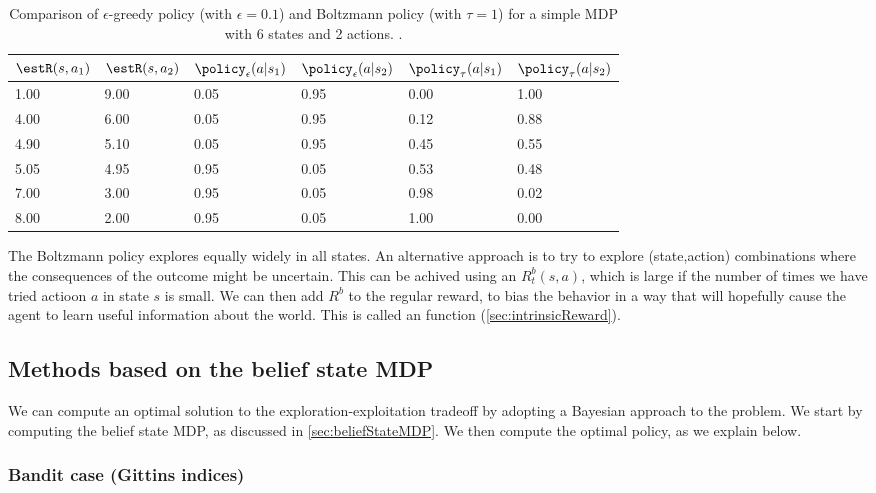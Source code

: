 \begin{table}
  \centering
\begin{tabular}{llllll}
  $\estR(s,a_1)$ & $\estR(s,a_2)$
  & $\policy_{\epsilon}(a|s_1)$     & $\policy_{\epsilon}(a|s_2)$  
    & $\policy_{\tau}(a|s_1)$     & $\policy_{\tau}(a|s_2)$     \\
  \hline
  1.00 & 9.00 & 0.05 & 0.95 & 0.00 & 1.00 \\
  4.00 & 6.00 & 0.05 & 0.95 & 0.12 & 0.88 \\
  4.90 & 5.10 & 0.05 & 0.95 & 0.45 & 0.55 \\
  5.05 & 4.95 & 0.95 & 0.05 & 0.53 & 0.48 \\
  7.00 & 3.00 & 0.95 & 0.05 & 0.98 & 0.02 \\
  8.00 & 2.00 & 0.95 & 0.05 & 1.00 & 0.00
\end{tabular}
\caption{Comparison of $\epsilon$-greedy policy (with $\epsilon=0.1$)
  and Boltzmann policy (with $\tau=1$) for a simple MDP with 6
  states and 2 actions.
  .
}
  \label{tab:epsGreedy}
\end{table}


The Boltzmann policy explores equally widely in all states.
An alternative approach is to try to explore (state,action)
combinations where the consequences of the outcome
might be uncertain.
This can be achived using  an 
$R^b_t(s,a)$, which is large if the number
of times we have tried actioon $a$ in state $s$ is small.
We can then add $R^b$ to the regular reward,
to bias the behavior in a way that will hopefully
cause the agent to learn useful information
about the  world.
This is called an  function
(\cref{sec:intrinsicReward}).



\subsection{Methods based on the belief state MDP}


We can compute an optimal solution to the exploration-exploitation
tradeoff by adopting a Bayesian approach to the problem.
We start by computing the belief state MDP, as discussed in
\cref{sec:beliefStateMDP}.
We then compute the optimal policy, as we explain below.



\subsubsection{Bandit case (Gittins indices)}
\label{sec:gittins}


